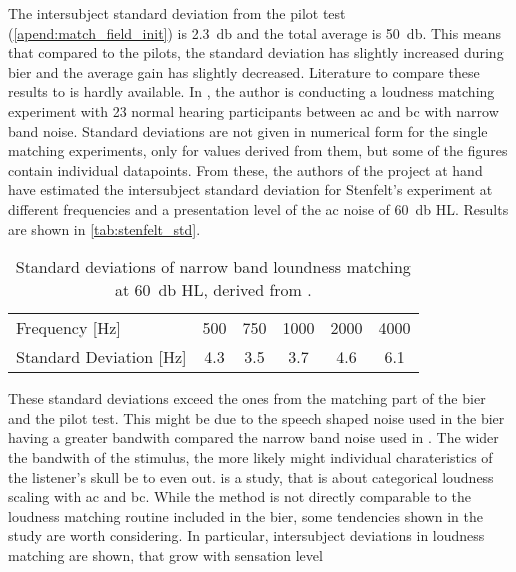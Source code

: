 The intersubject standard deviation from the pilot test (\autoref{apend:match_field_init}) is \SI{2.3}{\decibel} and the total average is \SI{50}{\decibel}.
This means that compared to the pilots, the standard deviation has slightly increased during \gls{bier} and the average gain has slightly decreased.
Literature to compare these results to is hardly available.
In \citep{stenfelt_02}, the author is conducting a loudness matching experiment with 23 normal hearing participants between \gls{ac} and \gls{bc} with narrow band noise. Standard deviations are not given in numerical form for the single matching experiments, only for values derived from them, but some of the figures contain individual datapoints.
From these, the authors of the project at hand have estimated the intersubject standard deviation for Stenfelt's experiment at different frequencies and a presentation level of the \gls{ac} noise of \SI{60}{\decibel} HL. Results are shown in \autoref{tab:stenfelt_std}.
\begin{table}[H]
\caption{Standard deviations of narrow band loundness matching at \SI{60}{\decibel} HL, derived from \citep[Fig. 1 b)-c)]{stenfelt_02}.}
\label{tab:stenfelt_std}
\centering
\begin{tabular}{lccccc}
Frequency [\si{\hertz}]          & 500 & 750 & 1000 & 2000 & 4000 \\
Standard Deviation [\si{\hertz}] & 4.3 & 3.5 & 3.7  & 4.6  & 6.1 
\end{tabular}
\end{table}
These standard deviations exceed the ones from the matching part of the \gls{bier} and the pilot test. This might be due to the speech shaped noise used in the \gls{bier} having a greater bandwith compared the narrow band noise used in \citep{stenfelt_02}. The wider the bandwith of the stimulus, the more likely might individual charateristics of the listener's skull be to even out.
\citep{STENFELT201385} is a study, that is about categorical loudness scaling with \gls{ac} and \gls{bc}. While the method is not directly comparable to the loudness matching routine included in the \gls{bier}, some tendencies shown in the study are worth considering. In particular, intersubject deviations in loudness matching are shown, that grow with sensation level

